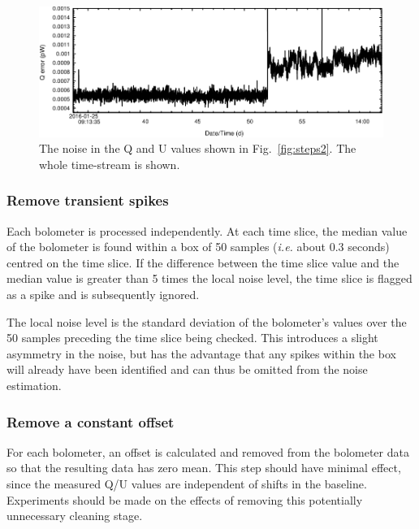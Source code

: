 \documentclass[twoside,11pt]{starlink}
\begin{document}
\begin{figure}
\includegraphics[width=\columnwidth]{steps4}
\caption{The noise in the Q and U values shown in Fig.~\ref{fig:steps2}.
The whole time-stream is shown.}
\label{fig:steps4}
\end{figure}

\subsubsection{Remove transient spikes}
Each bolometer is processed independently. At each time slice, the
median value of the bolometer is found within a box of 50 samples
(\emph{i.e.} about 0.3 seconds) centred on the time slice. If the
difference between the time slice value and the median value is greater
than 5 times the local noise level, the time slice is flagged as
a spike and is subsequently ignored.

The local noise level is the standard deviation of the bolometer's values
over the 50 samples preceding the time slice being checked. This
introduces a slight asymmetry in the noise, but has the advantage that
any spikes within the box will already have been identified and can thus
be omitted from the noise estimation.

\subsubsection{Remove a constant offset}
\label{sec:offset}
For each bolometer, an offset is calculated and removed from the bolometer
data so that the resulting data has zero mean. This step should have
minimal effect, since the measured Q/U values are independent of shifts in
the baseline. Experiments should be made on the effects of removing this
potentially unnecessary cleaning stage.
\end{document}
